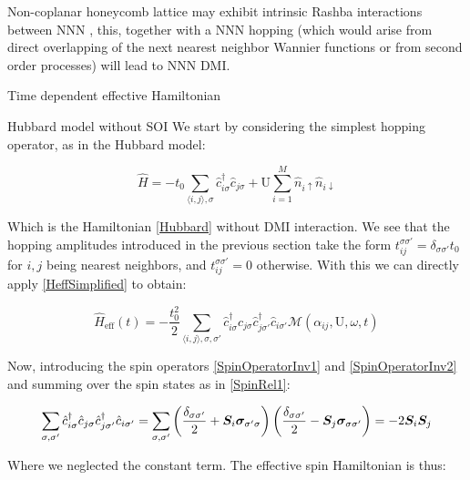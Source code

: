 Non-coplanar honeycomb lattice may exhibit intrinsic Rashba interactions between NNN \cite{Liu2011}, this, together with a NNN hopping (which would arise from direct overlapping of the next nearest neighbor Wannier functions or from second order processes) will lead to NNN DMI.

\begin{section}{Time dependent effective Hamiltonian}
\label{SectionTDHeff}


\end{section}

\begin{section}{Hubbard model without SOI}
\label{Section3Hubbard}
We start by considering the simplest hopping operator, as in the Hubbard model:

\begin{equation}
\hat{H} = -t_0\sum_{\langle i,j \rangle, \sigma} \hat{c}_{i \sigma}^\dagger \hat{c}_{j \sigma} + \text{U} \sum_{i=1}^M \hat{n}_{i\uparrow}\hat{n}_{i\downarrow}
\end{equation}

Which is the Hamiltonian \ref{Hubbard} without DMI interaction. We see that the hopping amplitudes introduced in the previous section take the form $t_{ij}^{\sigma \sigma'} = \delta_{\sigma \sigma'} t_0$ for $i,j$ being nearest neighbors, and $t_{ij}^{\sigma \sigma'} = 0$ otherwise. With this we can directly apply \ref{HeffSimplified} to obtain:

\begin{equation}
\hat{H}_{\text{eff}}(t) = -\frac{t_0^2}{2} \sum_{\langle i,j \rangle, \sigma, \sigma'} \hat{c}_{i \sigma}^\dagger \hat{c}_{j \sigma} \hat{c}_{j \sigma'}^\dagger \hat{c}_{i \sigma'} \mathcal{M}(\alpha_{ij}, \text{U}, \omega, t)
\end{equation}

Now, introducing the spin operators \ref{SpinOperatorInv1} and \ref{SpinOperatorInv2} and summing over the spin states as in \ref{SpinRel1}:

\begin{align*}
\sum_{\sigma, \sigma'} \hat{c}_{i \sigma}^\dagger \hat{c}_{j \sigma} \hat{c}_{j \sigma'}^\dagger \hat{c}_{i \sigma'} = \sum_{\sigma, \sigma'} \left( \frac{\delta_{\sigma \sigma'}}{2} + \boldsymbol{S}_i\boldsymbol{\sigma}_{\sigma' \sigma} \right) \left( \frac{\delta_{\sigma \sigma'}}{2} - \boldsymbol{S}_j\boldsymbol{\sigma}_{\sigma \sigma'} \right) = -2\boldsymbol{S}_i \boldsymbol{S}_j
\end{align*}

Where we neglected the constant term. The effective spin Hamiltonian is thus:


\end{section}
